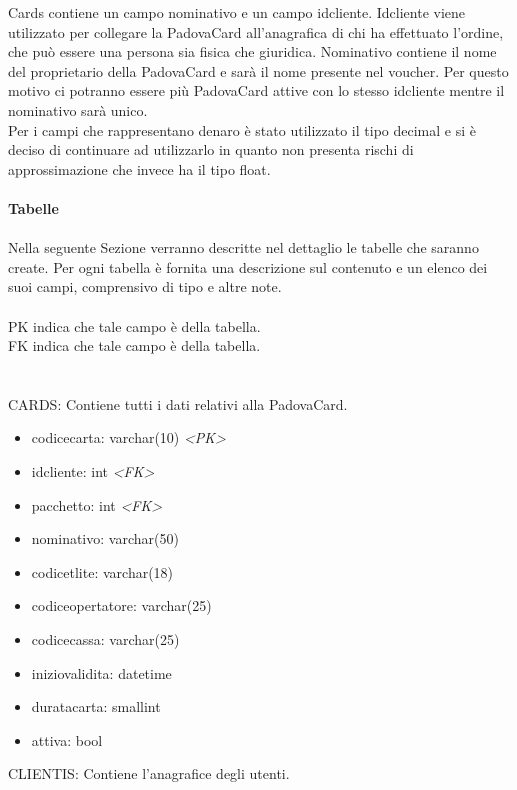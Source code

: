 Cards contiene un campo nominativo e un campo idcliente. Idcliente viene utilizzato per collegare la PadovaCard all'anagrafica di chi ha effettuato l'ordine, che può essere una persona sia fisica che giuridica. Nominativo contiene il nome del proprietario della PadovaCard e sarà il nome presente nel voucher. Per questo motivo ci potranno essere più PadovaCard attive con lo stesso idcliente mentre il nominativo sarà unico.\\

Per i campi che rappresentano denaro è stato utilizzato il tipo decimal e si è deciso di continuare ad utilizzarlo in quanto non presenta rischi di approssimazione che invece ha il tipo float. \\ \\
\textbf{Tabelle}\\ \\
Nella seguente Sezione verranno descritte nel dettaglio le tabelle che saranno create. Per ogni tabella è fornita una descrizione sul contenuto e un elenco dei suoi campi, comprensivo di tipo e altre note. \\ \\
PK indica che tale campo è  della tabella. \\
FK indica che tale campo  è  della tabella.\\
\\ \\
CARDS: Contiene tutti i dati relativi alla PadovaCard.
\begin{itemize}
\item codicecarta: varchar(10) \textit{\textless PK\textgreater}
\item idcliente: int \textit{\textless FK\textgreater}
\item pacchetto: int \textit{\textless FK\textgreater}
\item nominativo: varchar(50)
\item codicetlite: varchar(18)
\item codiceopertatore: varchar(25)
\item codicecassa: varchar(25)
\item iniziovalidita: datetime
\item duratacarta: smallint
\item attiva: bool 
\end{itemize}
CLIENTIS: Contiene l'anagrafice degli utenti.
